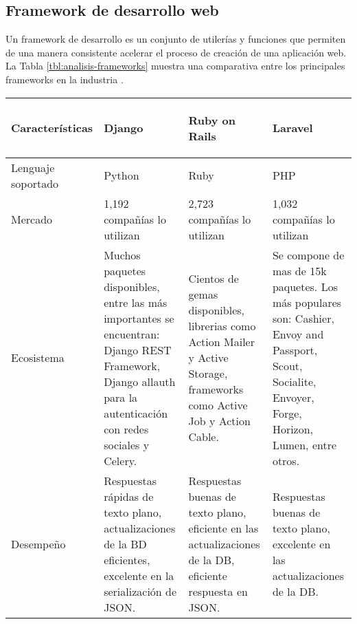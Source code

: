 \subsection{Framework de desarrollo web}

Un framework de desarrollo es un conjunto de utilerías y funciones que permiten de una manera consistente acelerar el proceso de creación de una aplicación web. La Tabla \ref{tbl:analisis-frameworks} muestra una comparativa entre los principales frameworks en la industria \cite{fComparacion}.

\begin{center}
    \begin{longtable}{|m{3.5cm}|m{3.5cm}|m{3.5cm}|m{3.5cm}|}
    
    \hline
    \begin{center}
        \textbf{Características}
    \end{center}                &
    \begin{center}
        \textbf{Django}
    \end{center}                &
    \begin{center}
        \textbf{Ruby on Rails}
    \end{center}                &
    \begin{center}
        \textbf{Laravel}
    \end{center} \\
    
    \hline
    Lenguaje soportado          &
    Python                      &
    Ruby                        &
    PHP \\
    
    \hline
    Mercado                     &
    1,192 compañías lo utilizan &
    2,723 compañías lo utilizan &
    1,032 compañías lo utilizan \\
    
    \hline
    Ecosistema                  &
    Muchos paquetes disponibles, entre las más importantes se encuentran: Django REST Framework, Django allauth para la autenticación con redes sociales y Celery.  &
    Cientos de gemas disponibles, librerias como Action Mailer y Active Storage, frameworks como Active Job y Action Cable. &
    Se compone de mas de 15k paquetes. Los más populares son: Cashier, Envoy and Passport, Scout, Socialite, Envoyer, Forge, Horizon, Lumen, entre otros. \\
    
    \hline
    Desempeño                   &
    Respuestas rápidas de texto plano, actualizaciones de la BD eficientes, excelente en la serialización de JSON.      &
    Respuestas buenas de texto plano, eficiente en las actualizaciones de la DB, eficiente respuesta en JSON.  &
    Respuestas buenas de texto plano, excelente en las actualizaciones de la DB. \\
    

\end{longtable}
\end{center}

